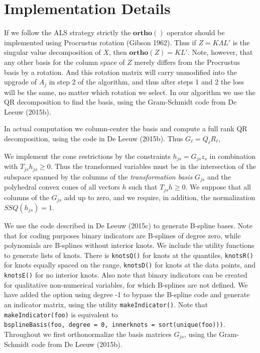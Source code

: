\documentclass[
  12pt,
  letterpaper,
  DIV=11,
  numbers=noendperiod]{scrreprt}
\begin{document}
\section{Implementation Details}\label{implementation-details}

If we follow the ALS strategy strictly the \(\mathbf{ortho}()\) operator
should be implemented using Procrustus rotation (Gibson 1962). Thus if
\(Z=K\Lambda L'\) is the singular value decomposition of \(X\), then
\(\mathbf{ortho}(Z)=KL'\). Note, however, that any other basis for the
column space of \(Z\) merely differs from the Procrustus basis by a
rotation. And this rotation matrix will carry unmodified into the
upgrade of \(A_j\) in step 2 of the algorithm, and thus after steps 1
and 2 the loss will be the same, no matter which rotation we select. In
our algorithm we use the QR decomposition to find the basis, using the
Gram-Schmidt code from De Leeuw (2015b).

In actual computation we column-center the basis and compute a full rank
QR decomposition, using the code in De Leeuw (2015b). Thus
\(G_\ell=Q_\ell R_\ell\),

We implement the cone restrictions by the constraints
\(h_{js}=G_{js}z_s\) in combination with \(T_{js}h_{js}\geq 0\). Thus
the transformed variables must be in the intersection of the subspace
spanned by the columns of the \emph{transformation basis} \(G_{js}\) and
the polyhedral convex cones of all vectors \(h\) such that
\(T_{js}h\geq 0\). We suppose that all columns of the \(G_{js}\) add up
to zero, and we require, in addition, the normalization
\(SSQ(h_{js})=1\).

We use the code described in De Leeuw (2015c) to generate B-spline
bases. Note that for coding purposes binary indicators are B-splines of
degree zero, while polynomials are B-splines without interior knots. We
include the utility functions to generate lists of knots. There is
\texttt{knotsQ()} for knots at the quantiles, \texttt{knotsR()} for
knots equally spaced on the range, \texttt{knotsD()} for knots at the
data points, and \texttt{knotsE()} for no interior knots. Also note that
binary indicators can be created for qualitative non-numerical
variables, for which B-splines are not defined. We have added the option
using degree -1 to bypass the B-spline code and generate an indicator
matrix, using the utility \texttt{makeIndicator()}. Note that
\texttt{\textquotesingle{}makeIndicator(foo)} is equivalent to
\texttt{bsplineBasis(foo,\ degree\ =\ 0,\ innerknots\ =\ sort(unique(foo)))}.
Throughout we first orthonormalize the basis matrices \(G_{js}\), using
the Gram-Schmidt code from De Leeuw (2015b).
\end{document}
